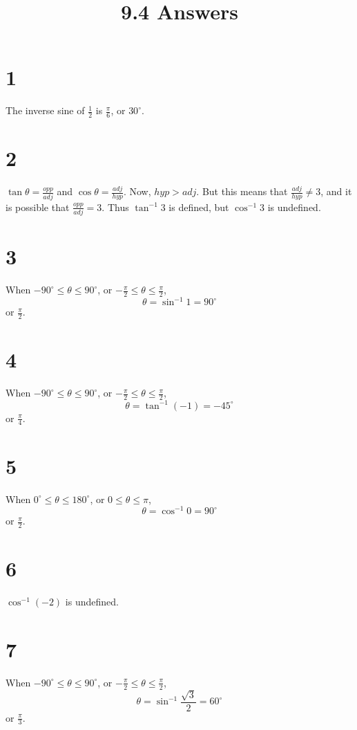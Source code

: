 \documentclass{article}
\title{9.4 Answers}
\theoremstyle{definition}
\newcommand{\?}{\stackrel{?}{=}}
\begin{document}
\maketitle

\section*{1}
The inverse sine of $\frac{1}{2}$ is $\frac{\pi}{6}$, or $30^\circ$.

\section*{2}
$\tan\theta=\frac{opp}{adj}$ and $\cos\theta=\frac{adj}{hyp}$. Now, $hyp>adj$. But this means that 
$\frac{adj}{hyp}\ne 3$, and it is possible that $\frac{opp}{adj}=3$. Thus $\tan^{-1}3$ is defined, but 
$\cos^{-1}3$ is undefined.

\section*{3}
When $-90^\circ\le\theta\le 90^\circ$, or $-\frac{\pi}{2}\le\theta\le\frac{\pi}{2}$,
\[ \theta=\sin^{-1}1=90^\circ \] or $\frac{\pi}{2}$.

\section*{4}
When $-90^\circ\le\theta\le 90^\circ$, or $-\frac{\pi}{2}\le\theta\le\frac{\pi}{2}$,
\[ \theta=\tan^{-1}\left(-1\right)=-45^\circ \] or $\frac{\pi}{4}$.

\section*{5}
When $0^\circ\le\theta\le 180^\circ$, or $0\le\theta\le\pi$,
\[ \theta=\cos^{-1}0=90^\circ \] or $\frac{\pi}{2}$.

\section*{6}
$\cos^{-1}(-2)$ is undefined.

\section*{7}
When $-90^\circ\le\theta\le 90^\circ$, or $-\frac{\pi}{2}\le\theta\le\frac{\pi}{2}$, \[ \theta=\sin^{-1}\frac{\sqrt{3}}{2}=60^\circ \] or 
$\frac{\pi}{3}$.
\end{document}
